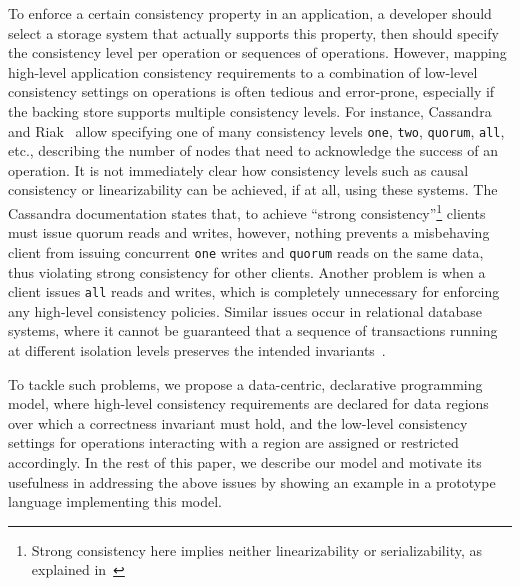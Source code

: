 \documentclass[preprint,numbers]{sigplanconf}
\begin{document}
To enforce a certain consistency
property in an application, a developer should select a storage system that
actually supports this property, then should specify the consistency level per
operation or
sequences of operations. However, mapping high-level application consistency requirements to a combination of
low-level consistency settings on operations is often tedious and error-prone, especially if
the backing store supports multiple consistency levels. For instance,
Cassandra~\cite{lakshman2010cassandra} and Riak~\cite{riak} allow specifying one of many
consistency levels
\texttt{one}, \texttt{two}, \texttt{quorum}, \texttt{all}, etc., describing the number of nodes that need to
acknowledge the success of an operation. It
is not immediately clear how consistency levels such as causal consistency or
linearizability can be achieved, if at all, using these systems. The Cassandra documentation
states that,
to achieve ``strong consistency''\footnote{Strong consistency here implies
neither linearizability or serializability, as explained in~\cite{sivaramakrishnan2016representation}} clients must issue quorum reads and writes,
however, nothing prevents a misbehaving client from issuing concurrent \texttt{one} writes and
\texttt{quorum} reads on the same data, thus violating strong consistency for other clients. Another
problem is when a client issues \texttt{all} reads and writes, which is completely
unnecessary for enforcing any high-level consistency policies. Similar issues
occur in relational database systems, where it cannot be guaranteed that a
sequence of transactions running at different isolation levels preserves the intended
invariants~\cite{gray1992transaction}. 


To tackle such problems, we propose a data-centric, declarative programming model, where
high-level consistency requirements are declared for data regions over which a correctness
invariant must hold, and the low-level consistency settings for operations interacting with
a region are assigned or restricted accordingly. In the rest of this paper, we describe our
model and motivate its usefulness in addressing the above issues by showing
an example in a prototype language implementing this model.

\end{document}
